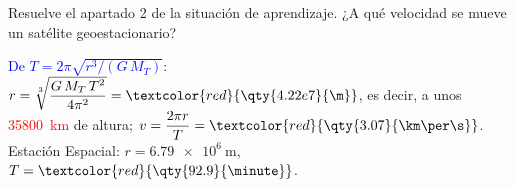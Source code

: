 \begin{exercise}
    Resuelve el apartado 2 de la situación de aprendizaje. ¿A qué velocidad se mueve un satélite geoestacionario?
    \begin{solu}
        \textcolor{blue}{De \(T = 2\pi\sqrt{r^3/(G\,M_T)}\):} \(r = \sqrt[3]{\dfrac{G\,M_T\,T^2}{4\pi^2}} = \textcolor{red}{\qty{4.22e7}{\m}}\),
        es decir, a unos \textcolor{red}{\qty{35800}{\km}} de altura; \(v = \dfrac{2\pi r}{T} = \textcolor{red}{\qty{3.07}{\km\per\s}}\).
        Estación Espacial: \(r = \qty{6.79e6}{\m}\), \(T = \textcolor{red}{\qty{92.9}{\minute}}\).
    \end{solu}
\end{exercise}
